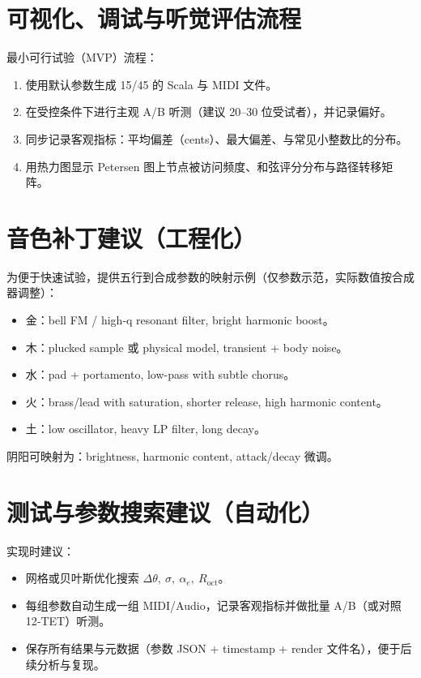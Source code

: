 \documentclass{article}
\begin{document}
\section{可视化、调试与听觉评估流程}
最小可行试验（MVP）流程：
\begin{enumerate}
  \item 使用默认参数生成 15/45 的 Scala 与 MIDI 文件。
  \item 在受控条件下进行主观 A/B 听测（建议 20–30 位受试者），并记录偏好。
  \item 同步记录客观指标：平均偏差（cents）、最大偏差、与常见小整数比的分布。
  \item 用热力图显示 Petersen 图上节点被访问频度、和弦评分分布与路径转移矩阵。
\end{enumerate}

\section{音色补丁建议（工程化）}
为便于快速试验，提供五行到合成参数的映射示例（仅参数示范，实际数值按合成器调整）：
\begin{itemize}
  \item 金：bell FM / high-q resonant filter, bright harmonic boost。
  \item 木：plucked sample 或 physical model, transient + body noise。
  \item 水：pad + portamento, low-pass with subtle chorus。
  \item 火：brass/lead with saturation, shorter release, high harmonic content。
  \item 土：low oscillator, heavy LP filter, long decay。
\end{itemize}
阴阳可映射为：brightness, harmonic content, attack/decay 微调。

\section{测试与参数搜索建议（自动化）}
实现时建议：
\begin{itemize}
  \item 网格或贝叶斯优化搜索 $\Delta\theta,\ \sigma,\ \alpha_e,\ R_{\mathrm{oct}}$。
  \item 每组参数自动生成一组 MIDI/Audio，记录客观指标并做批量 A/B（或对照 12‑TET）听测。
  \item 保存所有结果与元数据（参数 JSON + timestamp + render 文件名），便于后续分析与复现。
\end{itemize}
\end{document}
